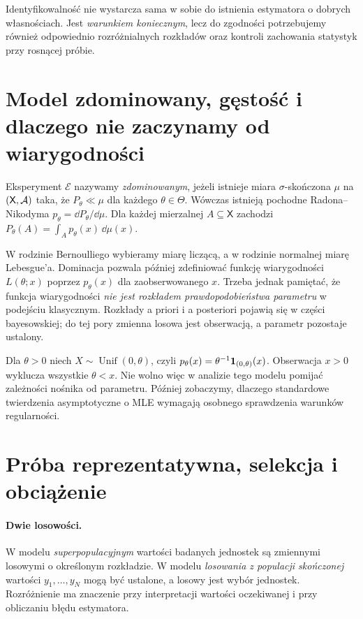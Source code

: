 \begin{uwaga}
Identyfikowalność nie wystarcza sama w sobie do istnienia estymatora o dobrych własnościach. Jest \emph{warunkiem koniecznym}, lecz do zgodności potrzebujemy również odpowiednio rozróżnialnych rozkładów oraz kontroli zachowania statystyk przy rosnącej próbie.
\end{uwaga}

\section{Model zdominowany, gęstość i dlaczego nie zaczynamy od wiarygodności}
\begin{definicja}
Eksperyment $\mathcal E$ nazywamy \emph{zdominowanym}, jeżeli istnieje miara $\sigma$-skończona $\mu$ na $(\mathsf X,\mathcal A)$ taka, że $P_\theta\ll\mu$ dla każdego $\theta\in\Theta$. Wówczas istnieją pochodne Radona--Nikodyma $p_\theta=\dd P_\theta/\dd\mu$. Dla każdej mierzalnej $A\subseteq\mathsf X$ zachodzi $P_\theta(A)=\int_Ap_\theta(x)\,\dd\mu(x)$.
\end{definicja}

W rodzinie Bernoulliego wybieramy miarę liczącą, a w rodzinie normalnej miarę Lebesgue'a. Dominacja pozwala później zdefiniować funkcję wiarygodności $L(\theta;x)$ poprzez $p_\theta(x)$ dla zaobserwowanego $x$. Trzeba jednak pamiętać, że funkcja wiarygodności \emph{nie jest rozkładem prawdopodobieństwa parametru} w podejściu klasycznym. Rozkłady a priori i a posteriori pojawią się w części bayesowskiej; do tej pory zmienna losowa jest obserwacją, a parametr pozostaje ustalony.

\begin{przyklad}\label{ex:uniform-support}
Dla $\theta>0$ niech $X\sim\operatorname{Unif}(0,\theta)$, czyli $p_\theta(x)=\theta^{-1}\mathbf 1_{(0,\theta)}(x)$. Obserwacja $x>0$ wyklucza wszystkie $\theta<x$. Nie wolno więc w analizie tego modelu pomijać zależności nośnika od parametru. Później zobaczymy, dlaczego standardowe twierdzenia asymptotyczne o MLE wymagają osobnego sprawdzenia warunków regularności.
\end{przyklad}

\section{Próba reprezentatywna, selekcja i obciążenie}
\paragraph{Dwie losowości.}
W modelu \emph{superpopulacyjnym} wartości badanych jednostek są zmiennymi losowymi o określonym rozkładzie. W modelu \emph{losowania z populacji skończonej} wartości $y_1,\ldots,y_N$ mogą być ustalone, a losowy jest wybór jednostek. Rozróżnienie ma znaczenie przy interpretacji wartości oczekiwanej i przy obliczaniu błędu estymatora.

